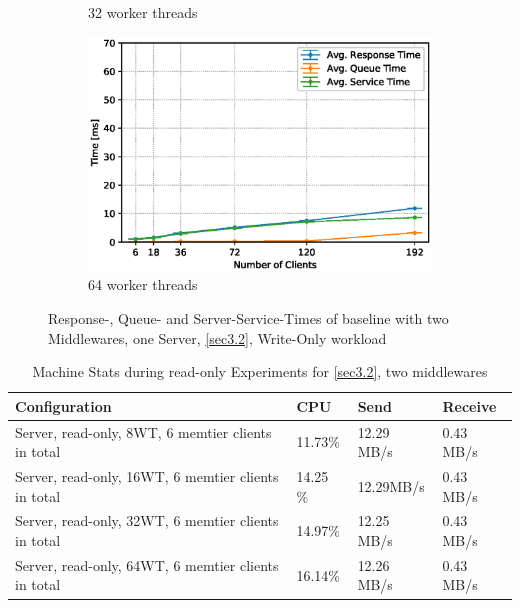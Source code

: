 \documentclass[11pt,a4paper]{article}
\begin{document}
\begin{figure}
\begin{subfigure}{.5\textwidth}
        \caption{32 worker threads}
    \end{subfigure}
    \begin{subfigure}{.5\textwidth}
        \includegraphics[width=1\linewidth]{plots/3_2b_extendedLatencyMiddleware_64w.eps}
        \caption{64 worker threads}
    \end{subfigure}

    \caption{Response-, Queue- and Server-Service-Times of baseline with two Middlewares, one Server, \autoref{sec3.2}, Write-Only workload}
    \label{fig:3-2-times-writeonly}
\end{figure}

\begin{center}
    \begin{table}
    	\begin{tabular}{|l|p{2cm}|p{2cm}|p{2cm}|}
            \hline \textbf{Configuration} & \textbf{CPU} & \textbf{Send} & \textbf{Receive}\\
            \hline Server, read-only, 8WT, 6 memtier clients in total & 11.73\%         & 12.29 MB/s    & 0.43 MB/s\\
            \hline Server, read-only, 16WT, 6 memtier clients in total & 14.25 \%         & 12.29MB/s    & 0.43 MB/s\\
            \hline Server, read-only, 32WT, 6 memtier clients in total & 14.97\%         & 12.25 MB/s    & 0.43 MB/s\\
            \hline Server, read-only, 64WT, 6 memtier clients in total & 16.14\%         & 12.26 MB/s    & 0.43 MB/s\\
            \hline
    	\end{tabular}
	\caption{Machine Stats during read-only Experiments for \autoref{sec3.2}, two middlewares}
    \label{dstat:3-2}
	\end{table}
\end{center}
\end{document}
